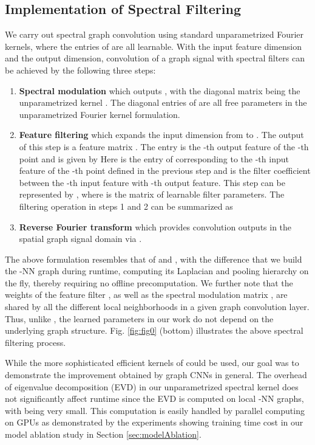 \documentclass[runningheads]{llncs}
\begin{document}
\subsection{Implementation of Spectral Filtering}
We carry out spectral graph convolution using standard unparametrized Fourier kernels, where the entries of  are all learnable. With  the input feature dimension and  the output dimension, convolution of a graph signal  with spectral filters can be achieved by the following three steps:
\begin{enumerate}
\item \textbf{Spectral modulation} which outputs , with the diagonal matrix  being the unparametrized kernel . The  diagonal entries of  are all free parameters in the unparametrized Fourier kernel formulation.
\item \textbf{Feature filtering} which expands the input dimension from  to . The output of this step is a feature matrix . The entry  is the -th output feature of the -th point and is given by 
Here  is the entry of  corresponding to the -th input feature of the -th point defined in the previous step and  is the filter coefficient between the -th input feature with -th output feature. This step can be represented by ,
where  is the matrix of learnable filter parameters.
The filtering operation in steps 1 and 2 can be summarized as 


\item \textbf{Reverse Fourier transform} which provides convolution outputs in the spatial graph signal domain via .
\end{enumerate}
The above formulation resembles that of \cite{defferrard2016convolutional} and \cite{kipf2016semi}, with the difference that we build the -NN graph during runtime, computing its Laplacian and pooling hierarchy on the fly, thereby requiring no offline precomputation. We further note that the weights of the feature filter , as well as the spectral modulation matrix , are shared by all the different local neighborhoods in a given graph convolution layer. Thus, unlike \cite{defferrard2016convolutional,kipf2016semi}, the learned parameters in our work do not depend on the underlying graph structure. Fig. \ref{fig:fig0} (bottom) illustrates the above spectral filtering process.

While the more sophisticated efficient kernels of \cite{defferrard2016convolutional} could be used, our goal was to demonstrate the improvement obtained by graph CNNs in general. The overhead of eigenvalue decomposition (EVD) in our unparametrized spectral kernel does not significantly affect runtime since the EVD is computed on local -NN graphs, with  being very small. This computation is easily handled by parallel computing on GPUs as demonstrated by the experiments showing training time cost in our model ablation study in Section \ref{sec:modelAblation}.
\end{document}
